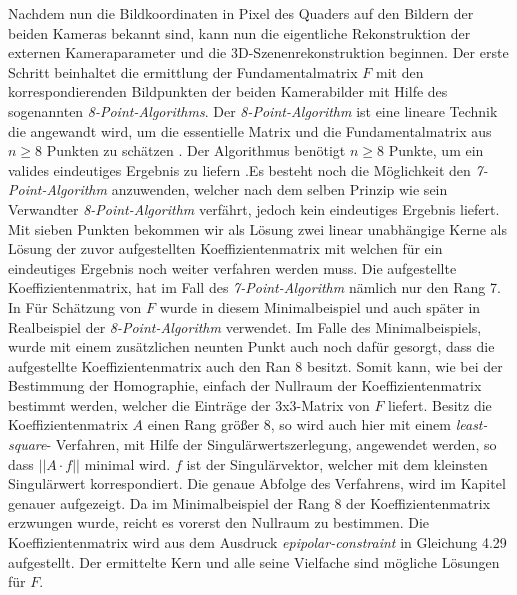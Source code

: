 Nachdem nun die Bildkoordinaten in Pixel des Quaders auf den Bildern der beiden Kameras bekannt sind, kann nun die eigentliche Rekonstruktion der externen Kameraparameter und die 3D-Szenenrekonstruktion beginnen. Der erste Schritt beinhaltet die ermittlung der Fundamentalmatrix $F$ mit den korrespondierenden Bildpunkten der beiden Kamerabilder mit Hilfe des sogenannten  \textit{8-Point-Algorithms}. Der \textit{8-Point-Algorithm} ist eine lineare Technik die angewandt wird, um die essentielle Matrix und die Fundamentalmatrix aus  $n \geq 8$ Punkten zu schätzen \cite{Zhang2014,HZ}. Der Algorithmus benötigt $n \geq 8$ Punkte, um ein valides eindeutiges Ergebnis zu liefern \cite{HZ,Ferid}.Es besteht noch die Möglichkeit den \textit{7-Point-Algorithm} anzuwenden, welcher nach dem selben Prinzip wie sein Verwandter \textit{8-Point-Algorithm} verfährt, jedoch kein eindeutiges Ergebnis liefert. Mit sieben Punkten bekommen wir als Lösung zwei linear unabhängige Kerne als Lösung der zuvor aufgestellten Koeffizientenmatrix mit welchen für ein eindeutiges Ergebnis noch weiter verfahren werden muss\cite{HZ,Ferid}. Die aufgestellte Koeffizientenmatrix, hat im Fall des \textit{7-Point-Algorithm} nämlich nur den Rang 7\cite{HZ}. In Für Schätzung von $F$ wurde in diesem Minimalbeispiel und auch später in Realbeispiel der \textit{8-Point-Algorithm} verwendet. Im Falle des Minimalbeispiels, wurde mit einem zusätzlichen neunten Punkt auch noch dafür gesorgt, dass die aufgestellte Koeffizientenmatrix auch den Ran 8 besitzt. Somit kann, wie bei der Bestimmung der Homographie, einfach der Nullraum der Koeffizientenmatrix bestimmt werden, welcher die Einträge der 3x3-Matrix von $F$ liefert\cite{HZ}. Besitz die Koeffizientenmatrix $A$ einen Rang größer 8, so wird auch hier mit einem \textit{least-square}- Verfahren, mit Hilfe der Singulärwertszerlegung, angewendet werden, so dass $||A \cdot f||$ minimal wird. $f$ ist der Singulärvektor, welcher mit dem kleinsten Singulärwert korrespondiert\cite{HZ}. Die genaue Abfolge des Verfahrens, wird im Kapitel  genauer aufgezeigt. Da im Minimalbeispiel der Rang 8 der Koeffizientenmatrix erzwungen wurde, reicht es vorerst den Nullraum zu bestimmen. Die Koeffizientenmatrix wird aus dem Ausdruck \textit{epipolar-constraint} in Gleichung 4.29 aufgestellt. Der ermittelte Kern und alle seine Vielfache sind mögliche Lösungen für $F$\cite{HZ,Ferid}. 

